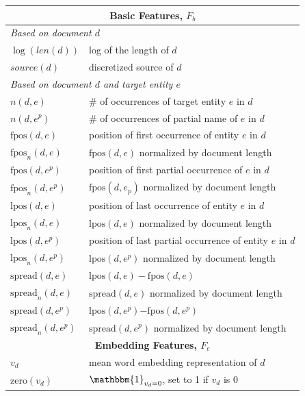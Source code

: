\documentclass{article}
\begin{document}
\begin{table}[tb]
\center
{\small
\begin{tabular}{p{}p{}}
\toprule
\multicolumn{2}{c}{\textbf{Basic Features, $F_b$}} \\ %
\midrule
\multicolumn{2}{l}{\emph{Based on document $d$}} \\ %
$\log(len(d))$ & log of the length of $d$ \\ %
$source(d)$ & discretized source of $d$ \\
\multicolumn{2}{l}{\emph{Based on document $d$ and target entity $e$}} \\ %
$n(d,e)$ & \# of occurrences of target entity $e$ in $d$ \\
$n(d,e^p)$ & \# of occurrences of partial name of $e$ in $d$ \\
$\text{fpos}(d,e)$ & position of first occurrence of entity $e$ in $d$ \\
$\text{fpos}_n(d,e)$ & $\text{fpos}(d,e)$ normalized by document length \\
$\text{fpos}(d,e^p)$ & position of first partial occurrence of $e$ in $d$ \\
$\text{fpos}_n(d,e^p)$ & $\text{fpos}(d,e_p)$ normalized by document length \\
$\text{lpos}(d,e)$ & position of last occurrence of entity $e$ in $d$ \\
$\text{lpos}_n(d,e)$ & $\text{lpos}(d,e)$ normalized by document length \\
$\text{lpos}(d,e^p)$ & position of last partial occurrence of entity $e$ in $d$ \\
$\text{lpos}_n(d,e^p)$ & $\text{lpos}(d,e^p)$ normalized by document length \\ 
$\text{spread}(d,e)$ & $\text{lpos}(d,e) - \text{fpos}(d,e)$ \\
$\text{spread}_n(d,e)$ & $\text{spread}(d,e)$ normalized by document length \\
$\text{spread}(d,e^p)$ & $\text{lpos}(d,e^p)\mathord{-}\text{fpos}(d,e^p)$ \\
$\text{spread}_n(d,e^p)$ & $\text{spread}(d,e^p)$ normalized by document length \\ 
\midrule
\multicolumn{2}{c}{\textbf{Embedding Features, $F_e$}} \\ %
\midrule
  $v_d$ & mean word embedding representation of $d$ \\
  $\text{zero}(v_d)$& $\mathbbm{1}_{v_d=0}$, set to 1 if $v_d$ is $0$ \\

\end{tabular}}
\end{table}
\end{document}
